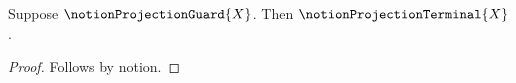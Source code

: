 

\begin{proposition}\label{notion_projection_prefix_result}
    Suppose $\notionProjectionGuard{X}$.
    Then $\notionProjectionTerminal{X}$.
\end{proposition}
\begin{proof}
    Follows by notion.
\end{proof}
